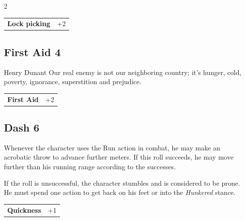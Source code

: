 \begin{multicols}{2}
\begin{tcolorbox}
\begin{tabular}{@{}ll@{}}
    \textbf{Lock picking} & +2\\
\end{tabular}


\end{tcolorbox}

\begin{tcolorbox}
    \subsection*{First Aid \hfill \small{4 }}
    \tcblower


\begin{pquote}{Henry Dunant}
Our real enemy is not our neighboring country; it's hunger, cold, poverty, ignorance, superstition and prejudice.
\end{pquote}

\vspace{3mm}

\begin{tabular}{@{}ll@{}}
    \textbf{First Aid} & +2\\
\end{tabular}


\end{tcolorbox}

\begin{tcolorbox}
    \subsection*{Dash \hfill \small{6 }}
    \tcblower
Whenever the character uses the Run action in combat, he may make an acrobatic throw to advance further meters. If this roll succeeds, he may move further than his running range according to the successes. 

If the roll is unsuccessful, the character stumbles and is considered to be prone. He must spend one action to get back on his feet or into the \textit{Hunkered} stance.


\vspace{3mm}

\begin{tabular}{@{}ll@{}}
    \textbf{Quickness} & +1\\
\end{tabular}


\end{tcolorbox}
\end{multicols}

